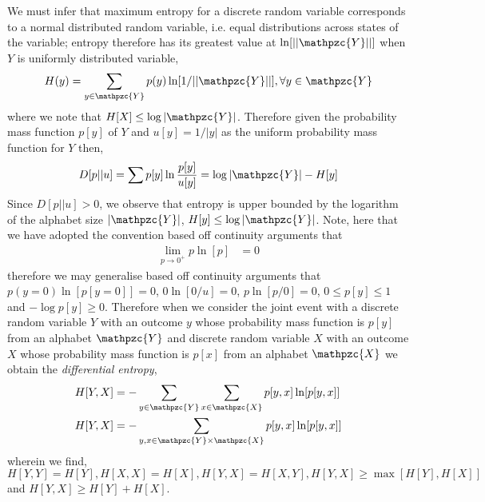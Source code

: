 \documentclass[7pt]{article}
\begin{document}
We must infer that maximum entropy for a discrete random variable  corresponds to a normal distributed random variable, i.e. equal distributions across states of the variable; entropy therefore has its greatest value at $\ln [|| \mathpzc{Y}||]$ when $Y$ is uniformly distributed variable,
$$
H(y) = \sum_{y \in \mathpzc{Y}}  p(y) \ln [1/||\mathpzc{Y}||], \forall y \in \mathpzc{Y}
$$ %
where we note that $H[X] \leq \log|\mathpzc{Y}|$. Therefore given the probability mass function $p[y]$ of $Y$ and  $u[y] = 1/|y|$ as the uniform probability mass function for $Y$ then,
$$
D[p||u] = \sum p[y] \ln \dfrac{p[y]}{u[y]} \\
=\log |\mathpzc{Y} | - H[y]
$$
Since $D[p||u] > 0$, we observe that entropy is upper bounded by the logarithm of the alphabet size $|\mathpzc{Y}|$,  $H[y] \leq \log |\mathpzc{Y}|$. Note, here that we have adopted the convention based off continuity arguments that
\begin{equation}
\begin{split}
\lim\limits_{ p \rightarrow 0^{+} } p \ln[ p]  & = 0
\end{split}
\end{equation}
therefore we may generalise based off continuity arguments that $p(y=0) \ln [ p[y=0]] = 0$, $0 \ln [0/u] = 0$, $p \ln [p/0] = 0$, $0 \leq p[y] \leq 1$  {and} $- \log p[y] \geq 0$. Therefore when we consider the joint event with a  discrete random variable $Y$ with an outcome $y$ whose probability mass function is $p[y]$ from an alphabet $\mathpzc{Y}$ and discrete random variable $X$ with an outcome $X$ whose probability mass function is $p[x]$ from an alphabet $\mathpzc{X}$ we obtain the \emph{differential entropy},
\begin{equation}
\begin{split}
H[Y,X] & = - \sum_{y \in \mathpzc{Y}} \sum_{x \in \mathpzc{X}}  p[y,x] \ln[ p[y,x]] \\
H[Y,X] & = - \sum_{y,x \in \mathpzc{Y} \times \mathpzc{X}} p[y,x] \ln[ p[y,x]]
\end{split}
\end{equation}
wherein we find, $H[Y,Y] = H[Y], H[X,X] = H[X], H[Y,X] = H[X,Y], H[Y,X] \geq \max [ H[Y], H[X] ]$ and $ H[Y,X] \geq H[Y] + H[X]$.
\end{document}
